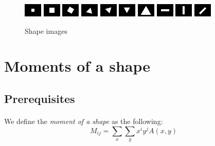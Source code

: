 \begin{figure}[h]
    \centering
    \includegraphics[scale=2.0]{rdf-carre-6.png}
    \includegraphics[scale=2.0]{rdf-carre-10.png}
    \includegraphics[scale=2.0]{rdf-carre-10-30deg.png}
    \includegraphics[scale=2.0]{rdf-triangle-10-15deg.png}
    \includegraphics[scale=2.0]{rdf-triangle-10-45deg.png}
    \includegraphics[scale=2.0]{rdf-triangle-10-60deg.png}
    \includegraphics[scale=2.0]{rdf-triangle-20.png}
    \includegraphics[scale=2.0]{rdf-rectangle-horizontal.png}
    \includegraphics[scale=2.0]{rdf-rectangle-vertical.png}
    \includegraphics[scale=2.0]{rdf-rectangle-diagonal.png}
    \caption{Shape images}
    \label{fig:gray-images}
\end{figure}

\clearpage

\section{Moments of a shape}
\subsection{Prerequisites}
\paragraph{}
We define the \emph{moment of a shape} as the following:
$$M_{ij} = \sum_{x}\sum_{y} x^{i} y^{j} A(x, y)$$
